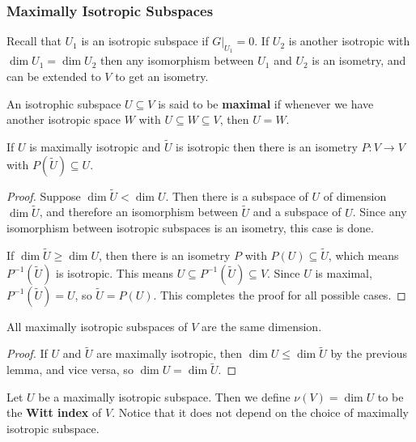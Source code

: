 \subsubsection{Maximally Isotropic Subspaces}
\begin{remark*}
    Recall that $U_1$ is an isotropic subspace if $G|_{U_1} = 0$. If $U_2$ is another isotropic with $\dim U_1 = \dim U_2$ then any isomorphism between $U_1$ and $U_2$ is an isometry, and can be extended to $V$ to get an isometry.
\end{remark*}
\begin{defn}
An isotrophic subspace $U\subseteq V$ is said to be \textbf{maximal} if whenever we have another isotropic space $W$ with $U\subseteq W\subseteq V$, then $U=W$.
\end{defn}
\begin{lemma}
    If $U$ is maximally isotropic and $\tilde{U}$ is isotropic then there is an isometry $P : V \to V$ with $P(\tilde{U})\subseteq U$.
\end{lemma}
\begin{proof}
    Suppose $\dim \tilde{U} < \dim U$. Then there is a subspace of $U$ of dimension $\dim \tilde{U}$, and therefore an isomorphism between $\tilde{U}$ and a subspace of $U$. Since any isomorphism between isotropic subspaces is an isometry, this case is done.

    If $\dim \tilde{U} \geq \dim U$, then there is an isometry $P$ with $P(U)\subseteq \tilde{U}$, which means $P^{-1}(\tilde{U})$ is isotropic. This means $U \subseteq P^{-1}(\tilde{U})\subseteq V$. Since $U$ is maximal, $P^{-1}(\tilde{U}) = U$, so $\tilde{U} = P(U)$. This completes the proof for all possible cases.
\end{proof}

\begin{cor}
    All maximally isotropic subspaces of $V$ are the same dimension.
\end{cor}
\begin{proof}
    If $U$ and $\tilde{U}$ are maximally isotropic, then $\dim U \leq \dim \tilde{U}$ by the previous lemma, and vice versa, so $\dim U = \dim \tilde{U}$.
\end{proof}
\begin{defn}
    Let $U$ be a maximally isotropic subspace. Then we define $\nu(V) = \dim U$ to be the \textbf{Witt index} of $V$. Notice that it does not depend on the choice of maximally isotropic subspace.
\end{defn}

